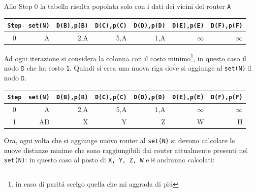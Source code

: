 \documentclass[12pt]{article}
\def\code#1{\texttt{#1}}
\begin{document}
Allo Step 0 la tabella risulta popolata solo con i dati dei vicini del router \code{A}
\begin{center}
\renewcommand{\arraystretch}{1.2}%
\begin{tabular}{ c r r r r r r }
	\code{Step} & \code{set(N)} & \code{D(B),p(B)} & \code{D(C),p(C)} & \code{D(D),p(D)} & \code{D(E),p(E)} & 
	\code{D(F),p(F)}\\ \hline
	0 &      A & 2,A              & 5,A              & {\color{red}1,A} & $\infty$         & $\infty$         \\ \hline
\end{tabular}
\end{center}
Ad ogni iterazione si considera la colonna con il costo minimo\footnote{\label{note1}in caso di parit\'a scelgo quella che mi aggrada di pi\'u}, in questo caso il nodo \code{D} che ha costo \code{1}. Quindi 
si crea una nuova riga dove si aggiunge al \code{set(N)} il nodo \code{D}.

\begin{center}
\renewcommand{\arraystretch}{1.2}%
\begin{tabular}{ c r r r r r r }
	\code{Step} & \code{set(N)} & \code{D(B),p(B)} & \code{D(C),p(C)} & \code{D(D),p(D)} & \code{D(E),p(E)} & 
	\code{D(F),p(F)}\\ \hline
	0 &      A & 2,A              & 5,A              & {\color{red}1,A} & $\infty$         & $\infty$         \\ \hline
	1 &     AD & X                & Y                & Z                & W                & H                \\ \hline
\end{tabular}
\end{center}
Ora, ogni volta che si aggiunge nuovo router al \code{set(N)} si devono calcolare le nuove distanze minime che sono 
raggiungibili dai router attualmente presenti nel \code{set(N)}: in questo caso al posto di \code{X, Y, Z, W} e \code{H} 
andranno calcolati:
\end{document}
